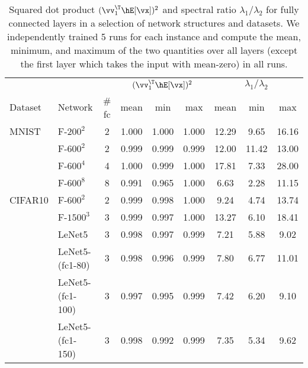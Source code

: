 \newpage

\begin{table}[h]
\small
  \centering
  \caption{Squared dot product $(\vv_1^\T\hE[\vx])^2$ and spectral ratio $\lambda_1/\lambda_2$ for fully connected layers in a selection of network structures and datasets. We independently trained 5 runs for each instance and compute the mean, minimum, and maximum of the two quantities over all layers (except the first layer which takes the input with mean-zero) in all runs.}
  \vskip 0.1in
    \begin{center}
    \begin{tabular}{llccccccc}
    \toprule
         &                  &              & \multicolumn{3}{c}{$(\vv_1^\T\hE[\vx])^2$} & \multicolumn{3}{c}{$\lambda_1/\lambda_2$} \\
Dataset  & Network          & \# fc & mean        & min         & max         & mean         & min          & max         \\
         \midrule
MNIST    & F-$200^2$        & 2            & 1.000       & 1.000       & 1.000       & 12.29        & 9.65         & 16.16       \\
         & F-$600^2$        & 2            & 0.999       & 0.999       & 0.999       & 12.00        & 11.42        & 13.00       \\
         & F-$600^4$        & 4            & 1.000       & 0.999       & 1.000       & 17.81        & 7.33         & 28.00       \\
         & F-$600^8$        & 8            & 0.991       & 0.965       & 1.000       & 6.63         & 2.28         & 11.15       \\
\midrule
CIFAR10  & F-$600^2$        & 2            & 0.999       & 0.998       & 1.000       & 9.24         & 4.74         & 13.74       \\
         & F-$1500^3$       & 3            & 0.999       & 0.997       & 1.000       & 13.27        & 6.10         & 18.41       \\
         & LeNet5           & 3            & 0.998       & 0.997       & 0.999       & 7.21         & 5.88         & 9.02        \\
         & LeNet5-(fc1-80)  & 3            & 0.998       & 0.996       & 0.999       & 7.80         & 6.77         & 11.01       \\
         & LeNet5-(fc1-100) & 3            & 0.997       & 0.995       & 0.999       & 7.42         & 6.20         & 9.10        \\
         & LeNet5-(fc1-150) & 3            & 0.998       & 0.992       & 0.999       & 7.35         & 5.34         & 9.62        \\

\end{tabular}
\end{center}
\end{table}
